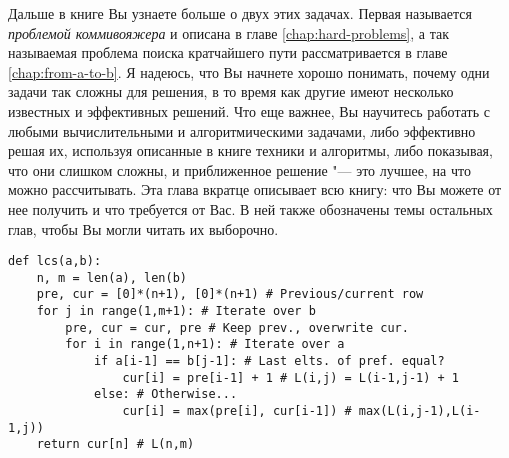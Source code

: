 Дальше в книге Вы узнаете больше о двух этих задачах. Первая называется \textit {проблемой коммивояжера} и описана в главе \ref{chap:hard-problems}, а так называемая проблема поиска кратчайшего пути рассматривается в главе \ref{chap:from-a-to-b}. Я надеюсь, что Вы начнете хорошо понимать, почему одни задачи так сложны для решения, в то время как другие имеют несколько известных и эффективных решений. Что еще важнее, Вы научитесь работать с любыми вычислительными и алгоритмическими задачами, либо эффективно решая их, используя описанные в книге техники и алгоритмы, либо показывая, что они слишком сложны, и приближенное решение "--- это лучшее, на что можно рассчитывать. Эта глава вкратце описывает всю книгу: что Вы можете от нее получить и что требуется от Вас. В ней также обозначены темы остальных глав, чтобы Вы могли читать их выборочно.


\begin{lstlisting}[caption={An Iterative Solution to the Longest Common Subsequence (LCS)}]
def lcs(a,b):
    n, m = len(a), len(b)
    pre, cur = [0]*(n+1), [0]*(n+1) # Previous/current row
    for j in range(1,m+1): # Iterate over b
        pre, cur = cur, pre # Keep prev., overwrite cur.
        for i in range(1,n+1): # Iterate over a
            if a[i-1] == b[j-1]: # Last elts. of pref. equal?
                cur[i] = pre[i-1] + 1 # L(i,j) = L(i-1,j-1) + 1
            else: # Otherwise...
                cur[i] = max(pre[i], cur[i-1]) # max(L(i,j-1),L(i-1,j))
    return cur[n] # L(n,m)
\end{lstlisting}


